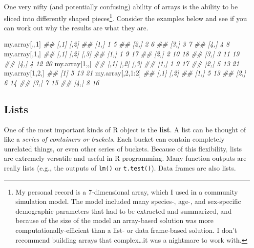 \documentclass[
  13,
  letterpaper,
]{report}
\newenvironment{Shaded}{\begin{snugshade}}{\end{snugshade}}
\newcommand{\DecValTok}[1]{\textcolor[rgb]{0.68,0.00,0.00}{#1}}
\newcommand{\DocumentationTok}[1]{\textcolor[rgb]{0.37,0.37,0.37}{\textit{#1}}}
\newcommand{\NormalTok}[1]{\textcolor[rgb]{0.00,0.23,0.31}{#1}}
\newcommand{\SpecialCharTok}[1]{\textcolor[rgb]{0.37,0.37,0.37}{#1}}
\begin{document}
One very nifty (and potentially confusing) ability of arrays is the
ability to be sliced into differently shaped pieces\footnote{My personal
  record is a 7-dimensional array, which I used in a community
  simulation model. The model included many species-, age-, and
  sex-specific demographic parameters that had to be extracted and
  summarized, and because of the size of the model an array-based
  solution was more computationally-efficient than a list- or data
  frame-based solution. I don't recommend building arrays that
  complex\ldots it was a nightmare to work with.}. Consider the examples
below and see if you can work out why the results are what they are.

\begin{Shaded}
\begin{Highlighting}[]
\NormalTok{my.array[,,}\DecValTok{1}\NormalTok{]}
\DocumentationTok{\#\#      [,1] [,2]}
\DocumentationTok{\#\# [1,]    1    5}
\DocumentationTok{\#\# [2,]    2    6}
\DocumentationTok{\#\# [3,]    3    7}
\DocumentationTok{\#\# [4,]    4    8}
\NormalTok{my.array[,}\DecValTok{1}\NormalTok{,]}
\DocumentationTok{\#\#      [,1] [,2] [,3]}
\DocumentationTok{\#\# [1,]    1    9   17}
\DocumentationTok{\#\# [2,]    2   10   18}
\DocumentationTok{\#\# [3,]    3   11   19}
\DocumentationTok{\#\# [4,]    4   12   20}
\NormalTok{my.array[}\DecValTok{1}\NormalTok{,,]}
\DocumentationTok{\#\#      [,1] [,2] [,3]}
\DocumentationTok{\#\# [1,]    1    9   17}
\DocumentationTok{\#\# [2,]    5   13   21}
\NormalTok{my.array[}\DecValTok{1}\NormalTok{,}\DecValTok{2}\NormalTok{,]}
\DocumentationTok{\#\# [1]  5 13 21}
\NormalTok{my.array[,}\DecValTok{2}\NormalTok{,}\DecValTok{1}\SpecialCharTok{:}\DecValTok{2}\NormalTok{]}
\DocumentationTok{\#\#      [,1] [,2]}
\DocumentationTok{\#\# [1,]    5   13}
\DocumentationTok{\#\# [2,]    6   14}
\DocumentationTok{\#\# [3,]    7   15}
\DocumentationTok{\#\# [4,]    8   16}
\end{Highlighting}
\end{Shaded}

\subsection{Lists}\label{sec-object-struct-list}

One of the most important kinds of R object is the \textbf{list}. A list
can be thought of like a \emph{series of containers or buckets}. Each
bucket can contain completely unrelated things, or even other series of
buckets. Because of this flexibility, lists are extremely versatile and
useful in R programming. Many function outputs are really lists (e.g.,
the outputs of \texttt{lm()} or \texttt{t.test()}). Data frames are also
lists.
\end{document}
